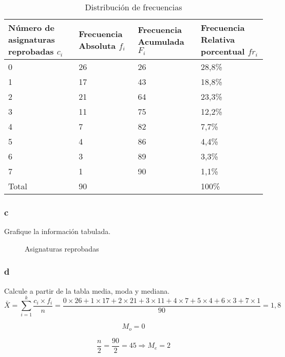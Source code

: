 \documentclass{templateNote}
\begin{document}
\begin{samepage}
    \begin{table}[H]
        \begin{center}
            \begin{tabularx}{\textwidth}{|L|L|L|L|}
                \hline
                Número de asignaturas reprobadas $c_i$ & Frecuencia Absoluta $f_i$ & Frecuencia Acumulada $F_i$ & Frecuencia Relativa porcentual $fr_i$ \\
                 & 26 & 26 & 28,8\% \\
                1 & 17 & 43 & 18,8\% \\
                2 & 21 & 64 & 23,3\% \\
                3 & 11 & 75 & 12,2\% \\
                4 & 7 & 82 & 7,7\% \\
                5 & 4 & 86 & 4,4\% \\
                6 & 3 & 89 & 3,3\% \\
                7 & 1 & 90 & 1,1\% \\
                \hline
                Total & 90 & & 100\% \\
                \hline
            \end{tabularx}
            \caption{Distribución de frecuencias}
        \end{center}
    \end{table}
    
\end{samepage}
\newpage
\subsubsection{c}
\indent
Grafique la información tabulada.

\begin{figure}[H]
    \begin{center}
        \caption{Asignaturas reprobadas}
    \end{center}
\end{figure}

\subsubsection{d}
\indent
Calcule a partir de la tabla media, moda y mediana.
\[
    \bar{X} = \sum_{i=1}^{k} \frac{c_i \times f_i}{n} = \frac{0 \times 26 + 1 \times 17 + 2 \times 21 + 3 \times 11 + 4 \times 7 + 5 \times 4 + 6 \times 3 + 7 \times 1}{90} = 1,8
\]

\[
    M_o = 0
\]

\[
    \frac{n}{2} = \frac{90}{2} = 45 \Rightarrow M_e = 2
\]
\end{document}
